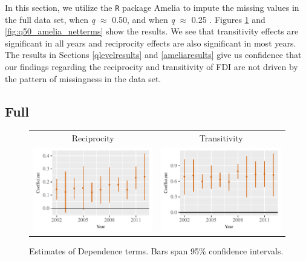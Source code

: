 \documentclass[reqno,onecolumn,letterpaper,12pt]{article}
\newcommand{\R}{\texttt{R}} %
\begin{document}
{In this section, we utilize the \R{} package Amelia to impute the missing values in the full data set,  when \emph{q} $\approx$ 0.50, and when \emph{q} $\approx$ 0.25 \citep{King_et_al:2001,honaker2011amelia}. Figures \ref{fig:full_amelia_netterms} and \ref{fig:q50_amelia_netterms} show the results. We see that transitivity effects are significant in all years and reciprocity effects are also significant in most years. The results in Sections \ref{qlevelresults} and \ref{ameliaresults} give us confidence that our findings regarding the reciprocity and transitivity of FDI are not driven by the pattern of missingness in the data set.

\subsection{Full}

\begin{figure}[!h]
\centering
\begin{tabular}{c@{\hskip 0cm}c}
Reciprocity & Transitivity \\
\includegraphics[height=.2\textheight, clip=true, trim=0cm 0cm 0cm .2cm]{draft_figures/rl_amelia_full/Mutuality.pdf}    &
\includegraphics[height=.2\textheight, clip=true, trim=0cm 0cm 0cm .2cm]{draft_figures/rl_amelia_full/Transitivity.pdf}
\end{tabular}
\caption{\label{fig:full_amelia_netterms} Estimates of Dependence terms. Bars span 95\% confidence intervals. }
\end{figure}








}
\end{document}
